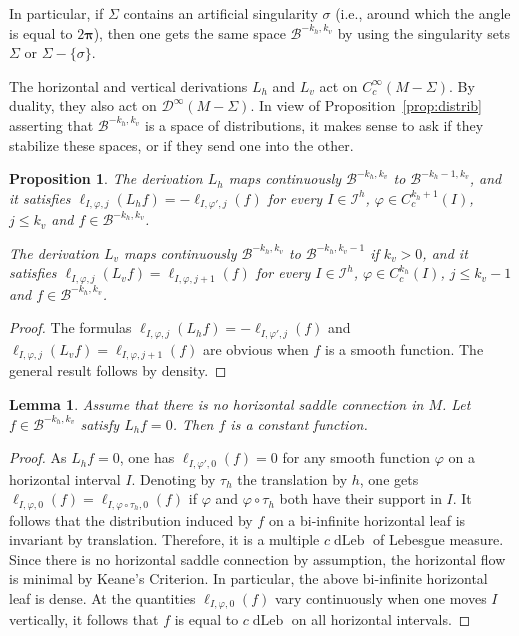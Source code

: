 \documentclass[11pt, a4paper, oneside, final, pagebackref]{amsart}
\newcommand{\boI}{\mathcal{I}}
\newcommand{\boB}{\mathcal{B}}
\newcommand{\boD}{\mathcal{D}}
\newcommand{\bpi}{\boldsymbol{\pi}}
\DeclareMathOperator{\dLeb}{dLeb}
\renewcommand{\phi}{\varphi}
\renewcommand{\leq}{\leqslant}
\newtheorem{prop}[thm]{Proposition}
\newtheorem{lem}[thm]{Lemma}
\theoremstyle{definition}
\numberwithin{equation}{section}
\begin{document}
In particular, if $\Sigma$ contains an artificial singularity $\sigma$ (i.e.,
around which the angle is equal to $2\bpi$), then one gets the same space
$\boB^{-k_h, k_v}$ by using the singularity sets $\Sigma$ or $\Sigma
-\{\sigma\}$.


\bigskip

The horizontal and vertical derivations $L_h$ and $L_v$ act on
$C^\infty_c(M-\Sigma)$. By duality, they also act on $\boD^\infty(M-\Sigma)$.
In view of Proposition~\ref{prop:distrib} asserting that $\boB^{-k_h, k_v}$ is
a space of distributions, it makes sense to ask if they
stabilize these spaces, or if they send one into the other.

\begin{prop}
\label{prop:Lh_Lv_action} The derivation $L_h$ maps continuously $\boB^{-k_h,
k_v}$ to $\boB^{-k_h-1, k_v}$, and it satisfies $\ell_{I,\phi, j}(L_h f) =
-\ell_{I,\phi', j}(f)$ for every $I \in \boI^h$, $\phi \in C^{k_h+1}_c(I)$,
$j \leq k_v$ and $f \in \boB^{-k_h, k_v}$.

The derivation $L_v$ maps continuously $\boB^{-k_h, k_v}$ to $\boB^{-k_h,
k_v-1}$ if $k_v>0$, and it satisfies $\ell_{I,\phi, j}(L_v f) = \ell_{I,
\phi, j+1}(f)$ for every $I \in \boI^h$, $\phi \in C^{k_h}_c(I)$, $j \leq
k_v-1$ and $f \in \boB^{-k_h, k_v}$.
\end{prop}
\begin{proof}
The formulas $\ell_{I,\phi, j}(L_h f) = -\ell_{I,\phi', j}(f)$ and
$\ell_{I,\phi, j}(L_v f) = \ell_{I, \phi, j+1}(f)$ are obvious when $f$ is a
smooth function. The general result follows by density.
\end{proof}

\begin{lem}
\label{lem:Lh_0} Assume that there is no horizontal saddle connection in $M$.
Let $f\in \boB^{-k_h, k_v}$ satisfy $L_h f = 0$. Then $f$ is a constant
function.
\end{lem}
\begin{proof}
As $L_h f = 0$, one has $\ell_{I,\phi', 0}(f) = 0$ for any smooth function
$\phi$ on a horizontal interval $I$. Denoting by $\tau_h$ the translation by
$h$, one gets $\ell_{I,\phi, 0}(f) = \ell_{I,\phi \circ \tau_h, 0}(f)$ if
$\phi$ and $\phi \circ \tau_h$ both have their support in $I$. It follows
that the distribution induced by $f$ on a bi-infinite horizontal leaf is
invariant by translation. Therefore, it is a multiple $c\dLeb$ of Lebesgue
measure. Since there is no horizontal saddle connection by assumption, the
horizontal flow is minimal by Keane's Criterion. In particular, the above
bi-infinite horizontal leaf is dense. At the quantities $\ell_{I,\phi, 0}(f)$
vary continuously when one moves $I$ vertically, it follows that $f$ is equal
to $c\dLeb$ on all horizontal intervals.
\end{proof}
\end{document}
